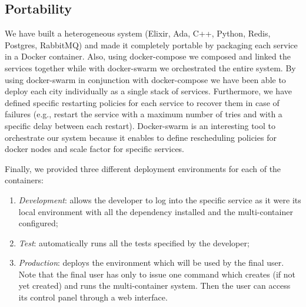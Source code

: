\subsection{Portability}
We have built a heterogeneous system
(Elixir, Ada, C++, Python, Redis, Postgres, RabbitMQ)
and made it completely portable by packaging each service in a Docker
container.
Also, using docker-compose we composed and linked the services together while with docker-swarm
we orchestrated the entire system. By using docker-swarm in conjunction with docker-compose we
have been able to deploy each city individually as a single stack of services. Furthermore, we
have defined specific restarting policies for each service to recover them in case of failures
(e.g., restart the service with a maximum number of tries and with a specific delay between each restart).
Docker-swarm is an interesting tool to orchestrate our system because it enables to define rescheduling policies
for docker nodes and scale factor for specific services.

Finally, we provided three different deployment environments for each of the
containers:
\begin{enumerate}
  \item \textit{Development}: allows the developer to
    log into the specific service as it were its local environment
    with all the dependency installed and the multi-container configured;
  \item \textit{Test}: automatically runs all the tests specified by
    the developer;
  \item \textit{Production}: deploys the environment which will be used by
    the final user. Note that the final user has only to issue one command
    which creates (if not yet created) and runs the multi-container system.
    Then the user can access its control panel through a web interface.
\end{enumerate}
